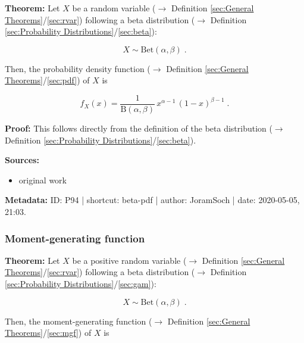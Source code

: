 \documentclass[a4paper,12pt,twoside]{book}
\begin{document}
\textbf{Theorem:} Let $X$ be a random variable ($\rightarrow$ Definition \ref{sec:General Theorems}/\ref{sec:rvar}) following a beta distribution ($\rightarrow$ Definition \ref{sec:Probability Distributions}/\ref{sec:beta}):

\begin{equation} \label{eq:beta-pdf-beta}
X \sim \mathrm{Bet}(\alpha, \beta) \; .
\end{equation}

Then, the probability density function ($\rightarrow$ Definition \ref{sec:General Theorems}/\ref{sec:pdf}) of $X$ is

\begin{equation} \label{eq:beta-pdf-beta-pdf}
f_X(x) = \frac{1}{\mathrm{B}(\alpha, \beta)} \, x^{\alpha-1} \, (1-x)^{\beta-1} \; .
\end{equation}


\vspace{1em}
\textbf{Proof:} This follows directly from the definition of the beta distribution ($\rightarrow$ Definition \ref{sec:Probability Distributions}/\ref{sec:beta}).


\vspace{1em}
\textbf{Sources:}
\begin{itemize}
\item original work\end{itemize}


\vspace{1em}
\textbf{Metadata:} ID: P94 | shortcut: beta-pdf | author: JoramSoch | date: 2020-05-05, 21:03.
\vspace{1em}



\subsubsection[\textbf{Moment-generating function}]{Moment-generating function} \label{sec:beta-mgf}
\setcounter{equation}{0}

\textbf{Theorem:} Let $X$ be a positive random variable ($\rightarrow$ Definition \ref{sec:General Theorems}/\ref{sec:rvar}) following a beta distribution ($\rightarrow$ Definition \ref{sec:Probability Distributions}/\ref{sec:gam}):

\begin{equation} \label{eq:beta-mgf-beta}
X \sim \mathrm{Bet}(\alpha, \beta) \; .
\end{equation}

Then, the moment-generating function ($\rightarrow$ Definition \ref{sec:General Theorems}/\ref{sec:mgf}) of $X$ is
\end{document}

